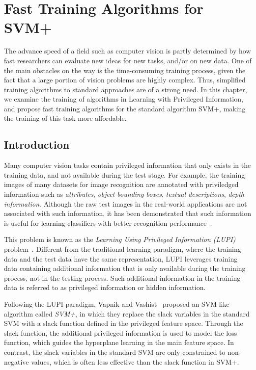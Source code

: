 \chapter{Fast Training Algorithms for SVM+}
\label{ch:svmplus}


The advance speed of a field such as computer vision is partly determined by how fast researchers can evaluate new ideas for new tasks, and/or on new data. One of the main obstacles on the way is the time-consuming training process, given the fact that a large portion of vision problems are highly complex.  Thus, simplified training algorithms to standard approaches are of a strong need.  In this chapter, we examine the training of algorithms in Learning with Privileged Information, and propose fast training algorithms for the standard algorithm SVM+, making the training of this task more affordable.  

\section{Introduction}  
Many computer vision tasks contain privileged information that only
exists in the training data, and not available during the test
stage. For example, the training images of many datasets for image
recognition are annotated with priviledged information such as
\emph{attributes}, \emph{object bounding boxes}, \emph{textual
  descriptions}, \emph{depth information}.  Although the raw test
images in the real-world applications are not associated with such
information, it has been demonstrated that such information is
useful for learning classifiers with better recognition
performance~\citep{Feyereisl2015,Lampert2013,RankTransfer,SVMplus_vapnik,Wang2015,HuaGang2014}.

This problem is known as the \emph{Learning Using Privileged
  Information (LUPI)} problem~\citep{SVMplus_vapnik}. Different from
the traditional learning paradigm, where the training data and the
test data have the same representation, LUPI leverages training data
containing additional information that is only available during the
training process, not in the testing process. Such additional
information in the training data is referred to as privileged
information or hidden information.

Following the LUPI paradigm, Vapnik and Vashist~\citep{SVMplus_vapnik}
proposed an SVM-like algorithm called \emph{SVM+}, in which they
replace the slack variables in the standard SVM with a slack function
defined in the privileged feature space. Through the slack function,
the additional privileged information is used to model the loss
function, which guides the hyperplane learning in the main feature
space. In contrast, the slack variables in the standard SVM are only
constrained to non-negative values, which is often less effective than
the slack function in SVM+.

